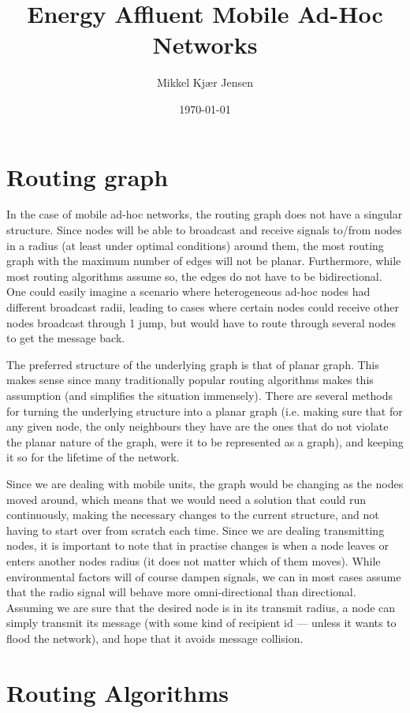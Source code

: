 \documentclass[letter, 12pt, english, draft]{article}
\title{Energy Affluent Mobile Ad-Hoc Networks}
\author{Mikkel Kjær Jensen}
\date{\today}
\begin{document}
\pagestyle{fancy}

\section{Routing graph}

In the case of mobile ad-hoc networks, the routing graph does not have a singular structure. Since nodes will be able to broadcast and receive signals to/from nodes in a radius (at least under optimal conditions) around them, the most routing graph with the maximum number of edges will not be planar. Furthermore, while most routing algorithms assume so, the edges do not have to be bidirectional. One could easily imagine a scenario where heterogeneous ad-hoc nodes had different broadcast radii, leading to cases where certain nodes could receive other nodes broadcast through 1 jump, but would have to route through several nodes to get the message back.

The preferred structure of the underlying graph is that of planar graph. This makes sense since many traditionally popular routing algorithms makes this assumption (and simplifies the situation immensely). There are several methods for turning the underlying structure into a planar graph (i.e. making sure that for any given node, the only neighbours they have are the ones that do not violate the planar nature of the graph, were it to be represented as a graph), and keeping it so for the lifetime of the network.

Since we are dealing with mobile units, the graph would be changing as the nodes moved around, which means that we would need a solution that could run continuously, making the necessary changes to the current structure, and not having to start over from scratch each time. Since we are dealing transmitting nodes, it is important to note that in practise changes is when a node leaves or enters another nodes radius (it does not matter which of them moves). While environmental factors will of course dampen signals, we can in most cases assume that the radio signal will behave more omni-directional than directional. Assuming we are sure that the desired node is in its transmit radius, a node can simply transmit its message (with some kind of recipient id --- unless it wants to flood the network), and hope that it avoids message collision.   

\section{Routing Algorithms}
\end{document}
